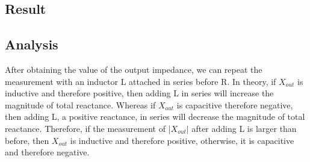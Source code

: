 \documentclass{article}
\begin{document}
\subsection*{Result}
\begin{table}[H]
    \centering
\end{table}

\subsection*{Analysis}
After obtaining the value of the output impedance, we can repeat the measurement with an inductor L attached in series before R. In theory, if $X_{out}$ is inductive and therefore positive, then adding L in series will increase the magnitude of total reactance. Whereas if $X_{out}$ is capacitive therefore negative, then adding L, a positive reactance, in series will decrease the magnitude of total reactance. Therefore, if the measurement of $|X_{out}|$ after adding L is larger than before, then $X_{out}$ is inductive and therefore positive, otherwise, it is capacitive and therefore negative.






\end{document}
